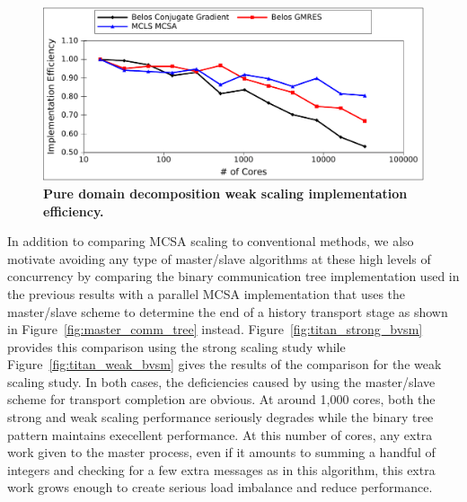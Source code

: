 \begin{figure}[t!]
  \begin{center}
    \includegraphics[width=6in]{chapters/parallel_mc/titan_weak_implementation.pdf}
  \end{center}
  \caption{\textbf{Pure domain decomposition weak scaling
      implementation efficiency.}}
  \label{fig:titan_weak_implementation}
\end{figure}

In addition to comparing MCSA scaling to conventional methods, we also
motivate avoiding any type of master/slave algorithms at these high
levels of concurrency by comparing the binary communication tree
implementation used in the previous results with a parallel MCSA
implementation that uses the master/slave scheme to determine the end
of a history transport stage as shown in
Figure~\ref{fig:master_comm_tree}
instead. Figure~\ref{fig:titan_strong_bvsm} provides this comparison
using the strong scaling study while Figure~\ref{fig:titan_weak_bvsm}
gives the results of the comparison for the weak scaling study. In
both cases, the deficiencies caused by using the master/slave scheme
for transport completion are obvious. At around 1,000 cores, both the
strong and weak scaling performance seriously degrades while the
binary tree pattern maintains execellent performance. At this number
of cores, any extra work given to the master process, even if it
amounts to summing a handful of integers and checking for a few extra
messages as in this algorithm, this extra work grows enough to create
serious load imbalance and reduce performance.

